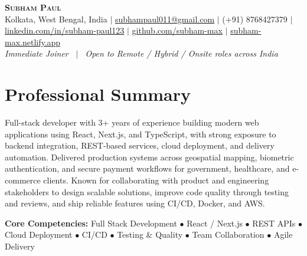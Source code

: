 \documentclass[letterpaper,10.5pt]{article}
\begin{document}
\begin{center}
    \textbf{\Huge \scshape Subham Paul} \\ \vspace{4pt}
    \small
    Kolkata, West Bengal, India $|$
    \href{mailto:subhampaul011@gmail.com}{subhampaul011@gmail.com} $|$
    (+91) 8768427379 $|$
    \href{https://linkedin.com/in/subham-paul123}{linkedin.com/in/subham-paul123} $|$
    \href{https://github.com/subham-max}{github.com/subham-max} $|$
    \href{https://subham-max.netlify.app}{subham-max.netlify.app} \\
    \vspace{2pt}
    \textit{Immediate Joiner \, $|$ \, Open to Remote / Hybrid / Onsite roles across India}
\end{center}


\section{Professional Summary}
\small{Full-stack developer with 3+ years of experience building modern web applications using React, Next.js, and TypeScript, with strong exposure to backend integration, REST-based services, cloud deployment, and delivery automation. Delivered production systems across geospatial mapping, biometric authentication, and secure payment workflows for government, healthcare, and e-commerce clients. Known for collaborating with product and engineering stakeholders to design scalable solutions, improve code quality through testing and reviews, and ship reliable features using CI/CD, Docker, and AWS.}

\vspace{4pt}
\small{\textbf{Core Competencies:} Full Stack Development $\bullet$ React / Next.js $\bullet$ REST APIs $\bullet$ Cloud Deployment $\bullet$ CI/CD $\bullet$ Testing \& Quality $\bullet$ Team Collaboration $\bullet$ Agile Delivery}

\end{document}
